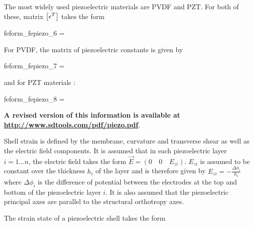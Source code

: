\begin{SDT}
The most widely used piezoelectric materials are PVDF and PZT. For
both of these, matrix $\left[\epsilon^T\right]$ takes the form
\begin{eqsvg}{feform_fepiezo_6}
  = 
 \end{eqsvg}

 For PVDF, the matrix of piezoelectric constants is given by

\begin{eqsvg}{feform_fepiezo_7}
  = 
 \end{eqsvg}

and for PZT materials :

\begin{eqsvg}{feform_fepiezo_8}
  = 
 \end{eqsvg}



{\bf A revised version of this information is available at \url{http://www.sdtools.com/pdf/piezo.pdf}}. 

 
Shell strain is defined by the membrane, curvature and transverse shear as well as the electric field components. It is assumed that
in each piezoelectric layer $i=1...n$, the electric field takes
the form $\vec{E}= (0 \quad 0 \quad E_{zi})$. $E_{zi}$ is assumed
to be constant over the thickness $h_i$ of the layer and is
therefore given by $E_{zi}=-\frac{\Delta \phi_i}{h_i}$ where
$\Delta \phi_i$ is the difference of potential between the
electrodes at the top and bottom of the piezoelectric layer $i$.
It is also assumed that the piezoelectric principal axes are
parallel to the structural orthotropy axes.

\begin{figure}[H]
\centering
{}
\end{figure}

The strain state of a piezoelectric shell takes the form


\end{SDT}
